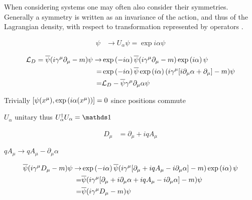 \documentclass[../main.tex]{subfiles} %
\begin{document}
When considering systems one may often also consider their symmetries. Generally a symmetry  is written as an invariance of the action, and thus of the Lagrangian density, with respect to transformation represented by operators \cite{peskin_introToQFT_1995}.

\begin{align}
    \psi &\rightarrow U_\alpha \psi = \exp{i\alpha}\psi
\end{align}

\begin{align}
\begin{split}
    \L_D = \psibar (i \gamma^\mu \partial_\mu - m) \psi \rightarrow
        & \exp{-i\alpha} \psibar (i \gamma^\mu \partial_\mu - m) \exp{i\alpha} \psi \\
        =& \exp{-i\alpha} \psibar \exp{i\alpha} (i \gamma^\mu [i \partial_\mu \alpha + \partial_\mu] - m) \psi \\
        =& \L_D - \psibar\gamma^\mu \partial_\mu \alpha \psi
\end{split}
\end{align}

Trivially $\commutator{\psi(x^\mu)}{\exp{i\alpha(x^\mu)}} = 0$ since positions commute

$U_\alpha$ unitary thus $U_\alpha\dagger U_\alpha = \id$

\begin{align}
    D_\mu &= \partial_\mu + iqA_\mu
\end{align}

$qA_\mu \rightarrow qA_\mu - \partial_\mu\alpha$

\begin{align}
\begin{split}
    \psibar (i \gamma^\mu D_\mu - m) \psi \rightarrow
        & \exp{-i\alpha} \psibar (i \gamma^\mu [\partial_\mu + iqA_\mu - i\partial_\mu\alpha] - m) \exp{i\alpha} \psi \\
        =& \psibar (i \gamma^\mu [\partial_\mu + i \partial_\mu \alpha + iqA_\mu - i\partial_\mu\alpha] - m) \psi \\
        =& \psibar (i \gamma^\mu D_\mu - m) \psi
\end{split}
\end{align}
\end{document}
